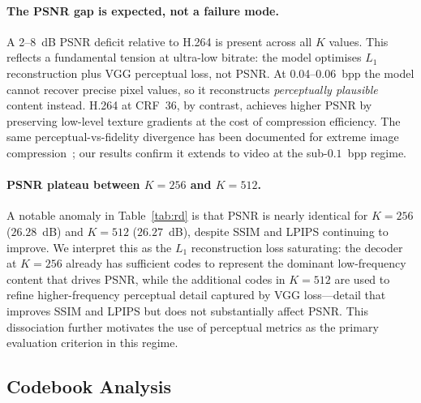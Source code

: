 \documentclass{article}
\begin{document}
\paragraph{The PSNR gap is expected, not a failure mode.}
A 2--8~dB PSNR deficit relative to H.264 is present across all $K$ values.
This reflects a fundamental tension at ultra-low bitrate: the model optimises
$L_1$ reconstruction plus VGG perceptual loss, not PSNR.
At 0.04--0.06~bpp the model cannot recover precise pixel values, so it
reconstructs \emph{perceptually plausible} content instead.
H.264 at CRF~36, by contrast, achieves higher PSNR by preserving
low-level texture gradients at the cost of compression efficiency.
The same perceptual-vs-fidelity divergence has been documented for extreme
image compression~\cite{mentzer2020highfidelity}; our results confirm it extends to
video at the sub-$0.1$~bpp regime.

\paragraph{PSNR plateau between $K{=}256$ and $K{=}512$.}
A notable anomaly in Table~\ref{tab:rd} is that PSNR is nearly identical
for $K{=}256$ ($26.28$~dB) and $K{=}512$ ($26.27$~dB), despite SSIM and
LPIPS continuing to improve.
We interpret this as the $L_1$ reconstruction loss saturating: the decoder
at $K{=}256$ already has sufficient codes to represent the dominant
low-frequency content that drives PSNR, while the additional codes in
$K{=}512$ are used to refine higher-frequency perceptual detail captured
by VGG loss---detail that improves SSIM and LPIPS but does not substantially
affect PSNR.
This dissociation further motivates the use of perceptual metrics as the
primary evaluation criterion in this regime.

\subsection{Codebook Analysis}
\label{sec:codebook}
\end{document}
